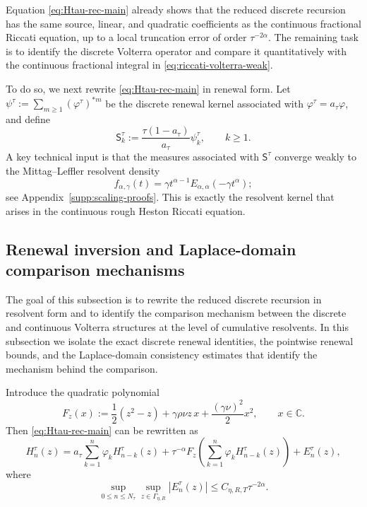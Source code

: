 \documentclass[letterpaper]{article}
\numberwithin{equation}{section}
\theoremstyle{definition}
\theoremstyle{remark}
\newcommand{\C}{\mathbb{C}}
\begin{document}
Equation \eqref{eq:Htau-rec-main} already shows that the reduced discrete recursion has the same source, linear, and quadratic coefficients as the continuous fractional Riccati equation, up to a local truncation error of order $\tau^{-2\alpha}$. The remaining task is to identify the discrete Volterra operator and compare it quantitatively with the continuous fractional integral in \eqref{eq:riccati-volterra-weak}.

To do so, we next rewrite \eqref{eq:Htau-rec-main} in renewal form. Let
$\psi^\tau:=\sum_{m\ge1}(\varphi^\tau)^{*m}$
be the discrete renewal kernel associated with $\varphi^\tau=a_\tau\varphi$, and define
\[
  \mathsf{S}_k^\tau:=\frac{\tau(1-a_\tau)}{a_\tau}\psi_k^\tau,
  \qquad k\ge1.
\]
A key technical input is that the measures associated with $\mathsf{S}^\tau$ converge weakly to the Mittag--Leffler resolvent density
\[
  f_{\alpha,\gamma}(t)=\gamma t^{\alpha-1}E_{\alpha,\alpha}(-\gamma t^\alpha);
\]
see Appendix~\ref{supp:scaling-proofs}.
This is exactly the resolvent kernel that arises in the continuous rough Heston Riccati equation.


\subsection{Renewal inversion and Laplace-domain comparison mechanisms}
\label{sec:renewal-comparison}

The goal of this subsection is to rewrite the reduced discrete recursion in
resolvent form and to identify the comparison mechanism between the discrete and
continuous Volterra structures at the level of cumulative resolvents. In this
subsection we isolate the exact discrete renewal identities, the pointwise
renewal bounds, and the Laplace-domain consistency estimates that identify the
mechanism behind the comparison. 

Introduce the quadratic polynomial
\begin{equation}\label{eq:Fz-def}
  F_z(x):=\frac12(z^2-z)+\gamma\rho\nu z\,x+\frac{(\gamma\nu)^2}{2}x^2,
  \qquad x\in\C.
\end{equation}
Then \eqref{eq:Htau-rec-main} can be rewritten as
\begin{equation}\label{eq:Htau-rec-main-again}
  H_n^\tau(z)
  =
  a_\tau\sum_{k=1}^n\varphi_k H_{n-k}^\tau(z)
  +\tau^{-\alpha}F_z\!\left(\sum_{k=1}^n\varphi_k H_{n-k}^\tau(z)\right)
  +E_n^\tau(z),
\end{equation}
where
\begin{equation}\label{eq:En-bound-again}
  \sup_{0\le n\le N_\tau}\sup_{z\in\Gamma_{\eta,R}}
  |E_n^\tau(z)|
  \le C_{\eta,R,T}\tau^{-2\alpha}.
\end{equation}
\end{document}
